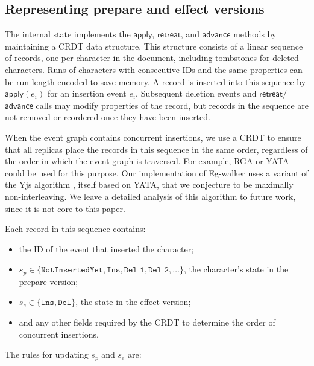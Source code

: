 \documentclass[sigplan,10pt]{acmart}
\newcommand{\algname}{Eg-walker\xspace}
\begin{document}
\subsection{Representing prepare and effect versions}\label{prepare-effect-versions}

The internal state implements the $\mathsf{apply}$, $\mathsf{retreat}$, and $\mathsf{advance}$ methods by maintaining a CRDT data structure.
This structure consists of a linear sequence of records, one per character in the document, including tombstones for deleted characters.
Runs of characters with consecutive IDs and the same properties can be run-length encoded to save memory.
A record is inserted into this sequence by $\mathsf{apply}(e_i)$ for an insertion event $e_i$.
Subsequent deletion events and $\mathsf{retreat}$/$\mathsf{advance}$ calls may modify properties of the record, but records in the sequence are not removed or reordered once they have been inserted.

When the event graph contains concurrent insertions, we use a CRDT to ensure that all replicas place the records in this sequence in the same order, regardless of the order in which the event graph is traversed.
For example, RGA \cite{Roh2011RGA} or YATA \cite{Nicolaescu2016YATA} could be used for this purpose.
Our implementation of \algname uses a variant of the Yjs algorithm \cite{yjs}, itself based on YATA, that we conjecture to be maximally non-interleaving.
We leave a detailed analysis of this algorithm to future work, since it is not core to this paper.

Each record in this sequence contains:
\begin{itemize}
\item the ID of the event that inserted the character;
\item $s_p \in \{\texttt{NotInsertedYet}, \texttt{Ins}, \texttt{Del 1}, \texttt{Del 2}, \dots\}$, the character's state in the prepare version;
\item $s_e \in \{\texttt{Ins}, \texttt{Del}\}$, the state in the effect version;
\item and any other fields required by the CRDT to determine the order of concurrent insertions.
\end{itemize}

The rules for updating $s_p$ and $s_e$ are:
\end{document}
